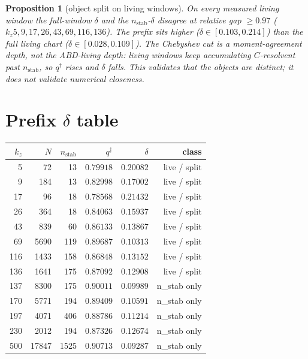 \documentclass[11pt]{article}
\newtheorem{prop}{Proposition}
\begin{document}
\begin{prop}[object split on living windows]\label{prop:split}
On every measured living window the full-window
$\delta$ and the $n_{\mathrm{stab}}$-$\delta$
disagree at relative gap $\ge 0.97$
($k_z5,9,17,26,43,69,116,136$).
The prefix sits higher ($\delta\in[0.103,0.214]$)
than the full living chart
($\delta\in[0.028,0.109]$).
The Chebyshev cut is a moment-agreement depth,
not the ABD-living depth: living windows keep
accumulating $C$-resolvent past $n_{\mathrm{stab}}$,
so $q^{\dagger}$ rises and $\delta$ falls.
This validates that the objects are distinct;
it does \emph{not} validate numerical closeness.
\end{prop}

\section{Prefix $\delta$ table}\label{sec:table}

\begin{center}
\small
\begin{tabular}{@{}rrrrrr@{}}
\toprule
$k_z$ & $N$ & $n_{\mathrm{stab}}$ & $q^{\dagger}$ & $\delta$ & class \\
\midrule
5 & 72 & 13 & $0.79918$ & $0.20082$ & live / split \\
9 & 184 & 13 & $0.82998$ & $0.17002$ & live / split \\
17 & 96 & 18 & $0.78568$ & $0.21432$ & live / split \\
26 & 364 & 18 & $0.84063$ & $0.15937$ & live / split \\
43 & 839 & 60 & $0.86133$ & $0.13867$ & live / split \\
69 & 5690 & 119 & $0.89687$ & $0.10313$ & live / split \\
116 & 1433 & 158 & $0.86848$ & $0.13152$ & live / split \\
136 & 1641 & 175 & $0.87092$ & $0.12908$ & live / split \\
137 & 8300 & 175 & $0.90011$ & $0.09989$ & n\_stab only \\
170 & 5771 & 194 & $0.89409$ & $0.10591$ & n\_stab only \\
197 & 4071 & 406 & $0.88786$ & $0.11214$ & n\_stab only \\
230 & 2012 & 194 & $0.87326$ & $0.12674$ & n\_stab only \\
500 & 17847 & 1525 & $0.90713$ & $0.09287$ & n\_stab only \\
\bottomrule
\end{tabular}
\end{center}
\end{document}
